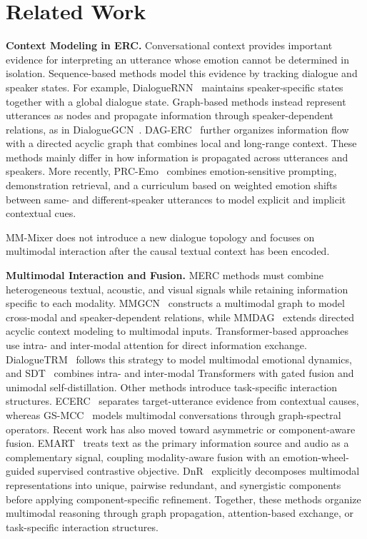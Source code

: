\documentclass[letterpaper]{article} %
\begin{document}
\section{Related Work}

\noindent\textbf{Context Modeling in ERC.}
Conversational context provides important evidence for interpreting an utterance whose emotion cannot be determined in isolation. Sequence-based methods model this evidence by tracking dialogue and speaker states. For example, DialogueRNN~\cite{dialoguernn} maintains speaker-specific states together with a global dialogue state. Graph-based methods instead represent utterances as nodes and propagate information through speaker-dependent relations, as in DialogueGCN~\cite{dialoguegcn}. DAG-ERC~\cite{dagerc} further organizes information flow with a directed acyclic graph that combines local and long-range context. These methods mainly differ in how information is propagated across utterances and speakers. More recently, PRC-Emo~\cite{prcemo} combines emotion-sensitive prompting, demonstration retrieval, and a curriculum based on weighted emotion shifts between same- and different-speaker utterances to model explicit and implicit contextual cues.

MM-Mixer does not introduce a new dialogue topology and focuses on multimodal interaction after the causal textual context has been encoded.

\noindent\textbf{Multimodal Interaction and Fusion.}
MERC methods must combine heterogeneous textual, acoustic, and visual signals while retaining information specific to each modality. MMGCN~\cite{mmgcn} constructs a multimodal graph to model cross-modal and speaker-dependent relations, while MMDAG~\cite{mmdag} extends directed acyclic context modeling to multimodal inputs. Transformer-based approaches use intra- and inter-modal attention for direct information exchange. DialogueTRM~\cite{dialoguetrm} follows this strategy to model multimodal emotional dynamics, and SDT~\cite{sdt} combines intra- and inter-modal Transformers with gated fusion and unimodal self-distillation. Other methods introduce task-specific interaction structures. ECERC~\cite{ecerc} separates target-utterance evidence from contextual causes, whereas GS-MCC~\cite{gsmcc} models multimodal conversations through graph-spectral operators. Recent work has also moved toward asymmetric or component-aware fusion. EMART~\cite{emart} treats text as the primary information source and audio as a complementary signal, coupling modality-aware fusion with an emotion-wheel-guided supervised contrastive objective. DnR~\cite{dnr} explicitly decomposes multimodal representations into unique, pairwise redundant, and synergistic components before applying component-specific refinement. Together, these methods organize multimodal reasoning through graph propagation, attention-based exchange, or task-specific interaction structures.
\end{document}
